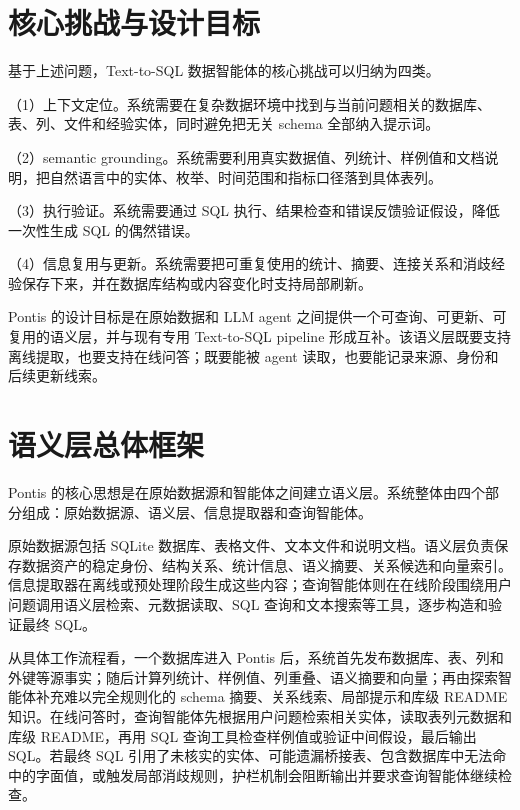 \documentclass[
    bachelor,
    pdflinks,
]{xjtuthesis}
\begin{document}
\section{核心挑战与设计目标}

基于上述问题，Text-to-SQL 数据智能体的核心挑战可以归纳为四类。

（1）上下文定位。系统需要在复杂数据环境中找到与当前问题相关的数据库、表、列、文件和经验实体，同时避免把无关 schema 全部纳入提示词。

（2）semantic grounding。系统需要利用真实数据值、列统计、样例值和文档说明，把自然语言中的实体、枚举、时间范围和指标口径落到具体表列。

（3）执行验证。系统需要通过 SQL 执行、结果检查和错误反馈验证假设，降低一次性生成 SQL 的偶然错误。

（4）信息复用与更新。系统需要把可重复使用的统计、摘要、连接关系和消歧经验保存下来，并在数据库结构或内容变化时支持局部刷新。

Pontis 的设计目标是在原始数据和 LLM agent 之间提供一个可查询、可更新、可复用的语义层，并与现有专用 Text-to-SQL pipeline 形成互补。该语义层既要支持离线提取，也要支持在线问答；既要能被 agent 读取，也要能记录来源、身份和后续更新线索。

\section{语义层总体框架}

Pontis 的核心思想是在原始数据源和智能体之间建立语义层。系统整体由四个部分组成：原始数据源、语义层、信息提取器和查询智能体。

原始数据源包括 SQLite 数据库、表格文件、文本文件和说明文档。语义层负责保存数据资产的稳定身份、结构关系、统计信息、语义摘要、关系候选和向量索引。信息提取器在离线或预处理阶段生成这些内容；查询智能体则在在线阶段围绕用户问题调用语义层检索、元数据读取、SQL 查询和文本搜索等工具，逐步构造和验证最终 SQL。

从具体工作流程看，一个数据库进入 Pontis 后，系统首先发布数据库、表、列和外键等源事实；随后计算列统计、样例值、列重叠、语义摘要和向量；再由探索智能体补充难以完全规则化的 schema 摘要、关系线索、局部提示和库级 README 知识。在线问答时，查询智能体先根据用户问题检索相关实体，读取表列元数据和库级 README，再用 SQL 查询工具检查样例值或验证中间假设，最后输出 SQL。若最终 SQL 引用了未核实的实体、可能遗漏桥接表、包含数据库中无法命中的字面值，或触发局部消歧规则，护栏机制会阻断输出并要求查询智能体继续检查。
\end{document}
